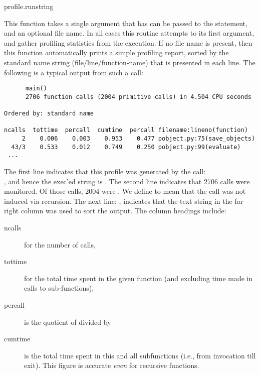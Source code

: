 \begin{funcdesc}{profile.run}{string}

This function takes a single argument that has can be passed to the
 statement, and an optional file name.  In all cases this
routine attempts to  its first argument, and gather profiling
statistics from the execution. If no file name is present, then this
function automatically prints a simple profiling report, sorted by the
standard name string (file/line/function-name) that is presented in
each line.  The following is a typical output from such a call:

\small{
\begin{verbatim}
      main()
      2706 function calls (2004 primitive calls) in 4.504 CPU seconds

Ordered by: standard name

ncalls  tottime  percall  cumtime  percall filename:lineno(function)
     2    0.006    0.003    0.953    0.477 pobject.py:75(save_objects)
  43/3    0.533    0.012    0.749    0.250 pobject.py:99(evaluate)
 ...
\end{verbatim}
}

The first line indicates that this profile was generated by the call:\\
, and hence the exec'ed string is
.  The second line indicates that 2706 calls were
monitored.  Of those calls, 2004 were .  We define
 to mean that the call was not induced via recursion.
The next line: , indicates that
the text string in the far right column was used to sort the output.
The column headings include:

\begin{description}

\item[ncalls ]
for the number of calls, 

\item[tottime ]
for the total time spent in the given function (and excluding time
made in calls to sub-functions),

\item[percall ]
is the quotient of  divided by 

\item[cumtime ]
is the total time spent in this and all subfunctions (i.e., from
invocation till exit). This figure is accurate \emph{even} for recursive
functions.


\end{description}
\end{funcdesc}
